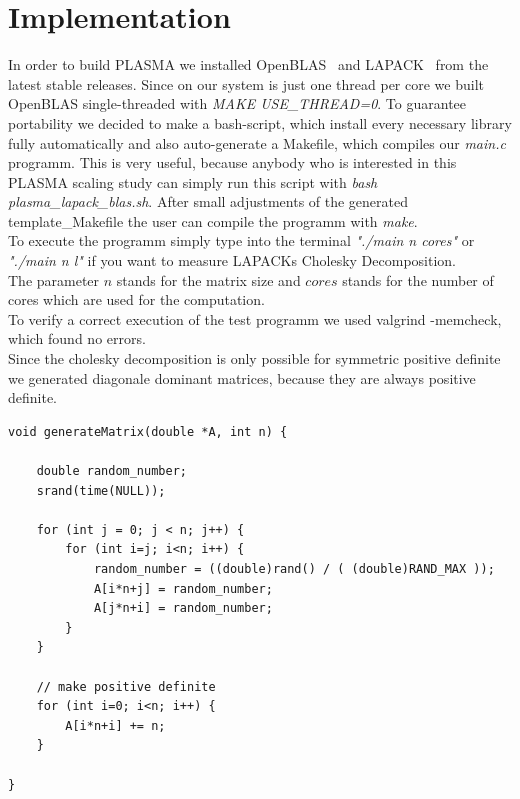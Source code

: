 \documentclass[a4paper,final,ngerman,english]{article}
\begin{document}
\section{Implementation}

In order to build PLASMA we installed OpenBLAS~\cite{openblas01} and LAPACK~\cite{lawn20} from the latest stable releases.
Since on our system is just one thread per core we built OpenBLAS single-threaded with \textit{MAKE USE\_THREAD=0}.
To guarantee portability we decided to make a bash-script, which install every necessary library fully automatically and also auto-generate a Makefile, which compiles our \textit{main.c} programm.
This is very useful, because anybody who is interested in this PLASMA scaling study can simply run this script with \textit{bash plasma\_lapack\_blas.sh}.
After small adjustments of the generated template\_Makefile the user can compile the programm with \textit{make}.
\\
To execute the programm simply type into the terminal \textit{"./main n cores"} or \textit{"./main n l"} if you want to measure LAPACKs Cholesky Decomposition.\\ The parameter $n$ stands for the matrix size and $cores$ stands for the number of cores which are used for the computation.\\
To verify a correct execution of the test programm we used valgrind -memcheck, which found no errors.\\
Since the cholesky decomposition is only possible for symmetric positive definite we generated diagonale dominant matrices, because they are always positive definite.
\begin{lstlisting}
void generateMatrix(double *A, int n) {

	double random_number;
	srand(time(NULL));

	for (int j = 0; j < n; j++) {
		for (int i=j; i<n; i++) {
			random_number = ((double)rand() / ( (double)RAND_MAX ));
			A[i*n+j] = random_number;
			A[j*n+i] = random_number;
		}
	}

	// make positive definite
	for (int i=0; i<n; i++) {
		A[i*n+i] += n;
	}

}
\end{lstlisting}
\end{document}
